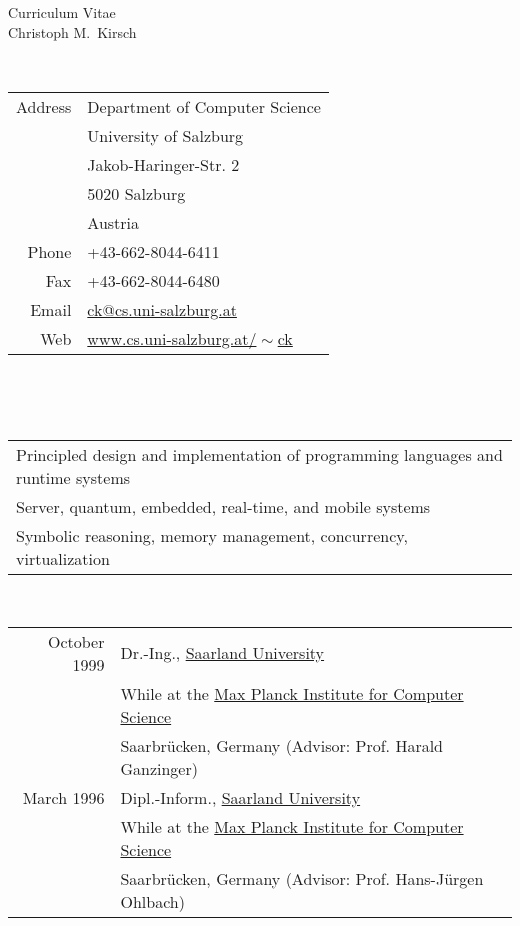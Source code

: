 \thispagestyle{empty}

\begin{center}
  {\sc \Huge Curriculum Vitae}\\ \vspace{10mm}
  {\sc \Large Christoph M.~Kirsch}\\ \vspace{12mm}
\end{center} \vfill

 \\
\begin{tabular}{rl}
Address & Department of Computer Science\\
        & University of Salzburg\\
        & Jakob-Haringer-Str. 2\\
        & 5020 Salzburg\\
        & Austria\\
\noalign{\smallskip}
Phone   & +43-662-8044-6411\\
Fax     & +43-662-8044-6480\\
Email   & \href{mailto:ck@cs.uni-salzburg.at}{ck@cs.uni-salzburg.at} \\
Web     & \href{http://www.cs.uni-salzburg.at/~ck}{www.cs.uni-salzburg.at/$\!\sim$ck} \\
\end{tabular} \\ \vfill

 \\
\begin{tabular}{l}
Principled design and implementation of programming languages and runtime systems \\
\noalign{\smallskip}
Server, quantum, embedded, real-time, and mobile systems \\
\noalign{\smallskip}
Symbolic reasoning, memory management, concurrency, virtualization
\end{tabular} \vfill

 \\
\begin{tabular}{rl}
October 1999 & Dr.-Ing., \href{http://www.uni-saarland.de}{Saarland University} \\
             & While at the \href{http://www.mpi-sb.mpg.de}{Max Planck Institute for Computer Science} \\
             & Saarbr{\"u}cken, Germany (Advisor: Prof. Harald Ganzinger)\\
\noalign{\smallskip}
March 1996 & Dipl.-Inform., \href{http://www.uni-saarland.de}{Saarland University} \\
           & While at the \href{http://www.mpi-sb.mpg.de}{Max Planck Institute for Computer Science} \\
           & Saarbr{\"u}cken, Germany (Advisor: Prof. Hans-J{\"u}rgen Ohlbach)\\
\end{tabular} \\ \vfill

